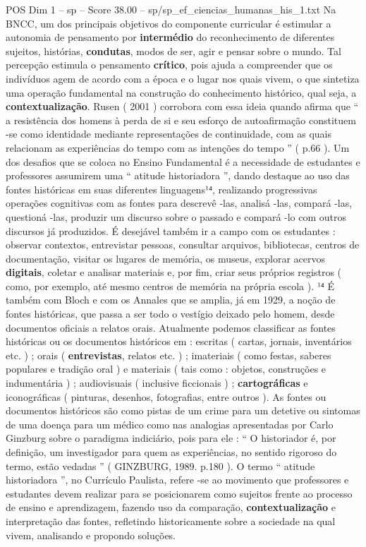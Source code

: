 \begin{textsample}{POS Dim 1 – sp – Score 38.00 – sp/sp\_ef\_ciencias\_humanas\_his\_1.txt}
Na BNCC, um dos principais objetivos do componente curricular é estimular a autonomia de pensamento por \textbf{intermédio} do reconhecimento de diferentes sujeitos, histórias, \textbf{condutas}, modos de ser, agir e pensar sobre o mundo.
Tal percepção estimula o pensamento \textbf{crítico}, pois ajuda a compreender que os indivíduos agem de acordo com a época e o lugar nos quais vivem, o que sintetiza uma operação fundamental na construção do conhecimento histórico, qual seja, a \textbf{contextualização}.
Rusen ( 2001 ) corrobora com essa ideia quando afirma que “ a resistência dos homens à perda de si e seu esforço de autoafirmação constituem -se como identidade mediante representações de continuidade, com as quais relacionam as experiências do tempo com as intenções do tempo ” ( p.66 ).
Um dos desafios que se coloca no Ensino Fundamental é a necessidade de estudantes e professores assumirem uma “ atitude historiadora ”, dando destaque ao uso das fontes históricas em suas diferentes linguagens¹⁴, realizando progressivas operações cognitivas com as fontes para descrevê -las, analisá -las, compará -las, questioná -las, produzir um discurso sobre o passado e compará -lo com outros discursos já produzidos.
É desejável também ir a campo com os estudantes : observar contextos, entrevistar pessoas, consultar arquivos, bibliotecas, centros de documentação, visitar os lugares de memória, os museus, explorar acervos \textbf{digitais}, coletar e analisar materiais e, por fim, criar seus próprios registros ( como, por exemplo, até mesmo centros de memória na própria escola ). ¹⁴ É também com Bloch e com os Annales que se amplia, já em 1929, a noção de fontes históricas, que passa a ser todo o vestígio deixado pelo homem, desde documentos oficiais a relatos orais.
Atualmente podemos classificar as fontes históricas ou os documentos históricos em : escritas ( cartas, jornais, inventários etc. ) ; orais ( \textbf{entrevistas}, relatos etc. ) ; imateriais ( como festas, saberes populares e tradição oral ) e materiais ( tais como : objetos, construções e indumentária ) ; audiovisuais ( inclusive ficcionais ) ; \textbf{cartográficas} e iconográficas ( pinturas, desenhos, fotografias, entre outros ).
As fontes ou documentos históricos são como pistas de um crime para um detetive ou sintomas de uma doença para um médico como nas analogias apresentadas por Carlo Ginzburg sobre o paradigma indiciário, pois para ele : “ O historiador é, por definição, um investigador para quem as experiências, no sentido rigoroso do termo, estão vedadas ” ( GINZBURG, 1989. p.180 ).
O termo “ atitude historiadora ”, no Currículo Paulista, refere -se ao movimento que professores e estudantes devem realizar para se posicionarem como sujeitos frente ao processo de ensino e aprendizagem, fazendo uso da comparação, \textbf{contextualização} e interpretação das fontes, refletindo historicamente sobre a sociedade na qual vivem, analisando e propondo soluções.

\end{textsample}
